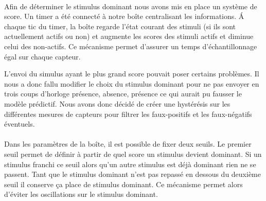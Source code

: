 \paragraph{}
Afin de déterminer le stimulus dominant nous avons mis en place un système de score. Un timer a 
été connecté à notre boîte centralisant les informations. \'A chaque tic du timer, la boîte regarde
l'état courant des stimuli (si ils sont actuellement actifs ou non) et augmente les scores des stimuli
actifs et diminue celui des non-actifs. Ce mécanisme permet d'assurer un temps d'échantillonnage égal
sur chaque capteur.

L'envoi du simulus ayant le plus grand score pouvait poser certains problèmes. Il nous a donc 
fallu modifier le choix du stimulus dominant pour ne pas envoyer en trois coups d'horloge
présence, absence, présence ce qui aurait pu fausser le modèle prédictif. 
Nous avons donc décidé de créer une hystérésis sur les différentes mesures de
capteurs pour filtrer les faux-positifs et les faux-négatifs éventuels. 

\paragraph{}
Dans les paramètres de la boîte, il est possible de fixer deux seuils.
Le premier seuil permet de définir à partir de quel score un stimulus devient dominant.
Si un stimulus franchi ce seuil alors qu'un autre stimulus est déjà dominant rien ne se passent.
Tant que le stimulus dominant n'est pas repassé en dessous du deuxième seuil il conserve ça place de 
stimulus dominant.
Ce mécanisme permet alors d'éviter les oscillations sur le stimulus dominant.

